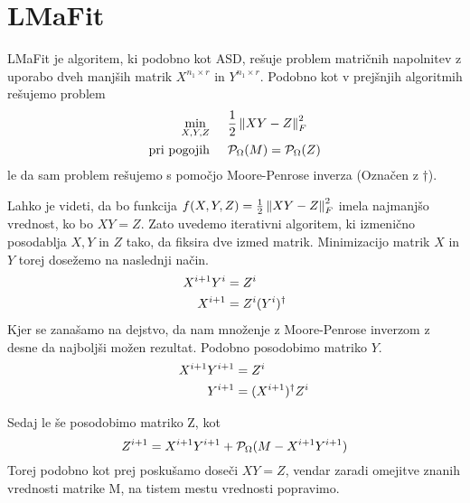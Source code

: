 \section{LMaFit}
LMaFit je algoritem, ki podobno kot ASD, rešuje problem matričnih napolnitev z uporabo dveh manjših matrik $X^{n_1 \times r}$ in $Y^{n_1 \times r}$. Podobno kot v prejšnjih algoritmih rešujemo problem 
\begin{align*}
    \min_{X, Y, Z}& \hspace{0.5cm} \frac{1}{2}\left\lVert XY - Z\right\rVert_F^2\\
    \text{pri pogojih}& \hspace{0.5cm} \mathcal{P}_\Omega(M) = \mathcal{P}_\Omega(Z)
\end{align*}
le da sam problem rešujemo s pomočjo Moore-Penrose inverza (Označen z $\dagger$).

Lahko je videti, da bo funkcija $f(X,Y,Z) = \frac{1}{2}\left\lVert XY - Z\right\rVert_F^2$ imela najmanjšo vrednost, ko bo $XY = Z$. Zato uvedemo iterativni algoritem, ki izmenično posodablja $X, Y$ in $Z$ tako, da fiksira dve izmed matrik. Minimizacijo matrik $X$ in $Y$ torej dosežemo na naslednji način.
\begin{align*}
    X^{i+1}Y^{i} &= Z^{i} \hspace{0.5cm} \\
    X^{i+1} &= Z^{i}(Y^i)^\dagger
\end{align*}
Kjer se zanašamo na dejstvo, da nam množenje z Moore-Penrose inverzom z desne 
da najboljši možen rezultat.
Podobno posodobimo matriko $Y$.
\begin{align*}
    \hspace{0.5cm} X^{i+1}Y^{i+1} &= Z^{i}   \\
    Y^{i+1} &= (X^{i+1})^\dagger Z^{i}
\end{align*}

Sedaj le še posodobimo matriko Z, kot
\[
    Z^{i+1} = X^{i+1}Y^{i+1} + \mathcal{P}_\Omega(M - X^{i+1}Y^{i+1})
\]
Torej podobno kot prej poskušamo doseči $XY = Z$, vendar zaradi omejitve znanih vrednosti matrike M, na tistem mestu vrednosti popravimo. \cite{LMaFit-WY12}
